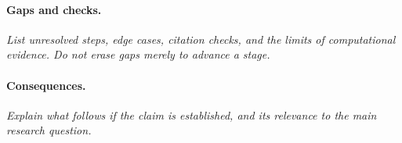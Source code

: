 \paragraph{Gaps and checks.}
\emph{List unresolved steps, edge cases, citation checks, and the limits of
computational evidence. Do not erase gaps merely to advance a stage.}

\paragraph{Consequences.}
\emph{Explain what follows if the claim is established, and its relevance
to the main research question.}

